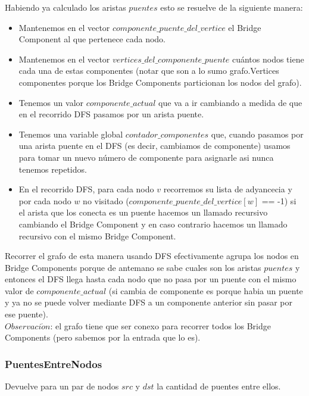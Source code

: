 Habiendo ya calculado los aristas $puentes$ esto se resuelve de la siguiente manera:
\begin{itemize}
	\item Mantenemos en el vector $componente\_puente\_del\_vertice$ el Bridge Component al que pertenece cada nodo.
	\item Mantenemos en el vector $vertices\_del\_componente\_puente$ cuántos nodos tiene cada una de estas componentes
	(notar que son a lo sumo grafo.Vertices componentes porque los Bridge Components particionan los nodos del grafo).
	\item Tenemos un valor $componente\_actual$ que va a ir cambiando a medida de que en el recorrido DFS pasamos por un arista puente.
	\item Tenemos una variable global $contador\_componentes$ que, cuando pasamos por una arista puente en el DFS (es decir, cambiamos
	de componente) usamos para tomar un nuevo n\'umero de componente para asignarle asi nunca tenemos repetidos.
	\item En el recorrido DFS, para cada nodo $v$ recorremos su lista de adyancecia y por cada nodo $w$ no visitado
	($componente\_puente\_del\_vertice[w]$ == -1) si el arista que los conecta es un puente hacemos un llamado recursivo cambiando el
	Bridge Component y en caso contrario hacemos un llamado recursivo con el mismo Bridge Component.
\end{itemize}

Recorrer el grafo de esta manera usando DFS efectivamente agrupa los nodos en Bridge Components porque de antemano se sabe cuales son 
los aristas $puentes$ y entonces el DFS llega hasta cada nodo que no pasa por un puente con el mismo valor de $componente\_actual$ (si
cambia de componente es porque habia un puente y ya no se puede volver mediante DFS a un componente anterior sin pasar por ese puente). \\

$Observaci\acute{o}n$: el grafo tiene que ser conexo para recorrer todos los Bridge Components (pero sabemos por la entrada que lo es). \\

\subsubsection*{PuentesEntreNodos}

Devuelve para un par de nodos $src$ y $dst$ la cantidad de puentes entre ellos. \\

